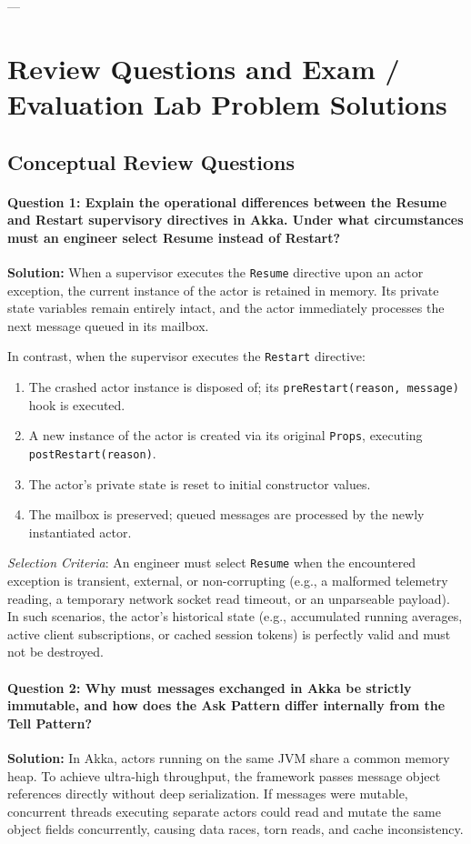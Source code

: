 ---

\section{Review Questions and Exam / Evaluation Lab Problem Solutions}

\subsection{Conceptual Review Questions}

\paragraph{Question 1: Explain the operational differences between the Resume and Restart supervisory directives in Akka. Under what circumstances must an engineer select Resume instead of Restart?}
\textbf{Solution:}
When a supervisor executes the \texttt{Resume} directive upon an actor exception, the current instance of the actor is retained in memory. Its private state variables remain entirely intact, and the actor immediately processes the next message queued in its mailbox.

In contrast, when the supervisor executes the \texttt{Restart} directive:
\begin{enumerate}
    \item The crashed actor instance is disposed of; its \texttt{preRestart(reason, message)} hook is executed.
    \item A new instance of the actor is created via its original \texttt{Props}, executing \texttt{postRestart(reason)}.
    \item The actor's private state is reset to initial constructor values.
    \item The mailbox is preserved; queued messages are processed by the newly instantiated actor.
\end{enumerate}
\textit{Selection Criteria}: An engineer must select \texttt{Resume} when the encountered exception is transient, external, or non-corrupting (e.g., a malformed telemetry reading, a temporary network socket read timeout, or an unparseable payload). In such scenarios, the actor's historical state (e.g., accumulated running averages, active client subscriptions, or cached session tokens) is perfectly valid and must not be destroyed.

\paragraph{Question 2: Why must messages exchanged in Akka be strictly immutable, and how does the Ask Pattern differ internally from the Tell Pattern?}
\textbf{Solution:}
In Akka, actors running on the same JVM share a common memory heap. To achieve ultra-high throughput, the framework passes message object references directly without deep serialization. If messages were mutable, concurrent threads executing separate actors could read and mutate the same object fields concurrently, causing data races, torn reads, and cache inconsistency.

